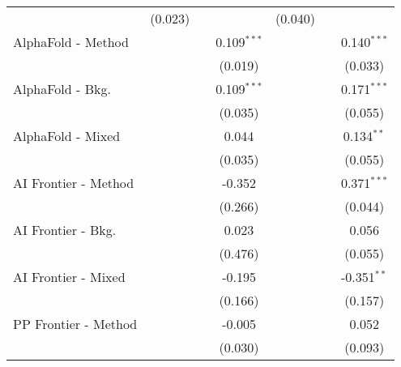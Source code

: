 \begin{tabular}{lcccccc}
                                  & (0.023)        &                &                & (0.040)        &                &   \\   
   AlphaFold - Method             &                &                & 0.109$^{***}$  &                &                & 0.140$^{***}$\\   
                                  &                &                & (0.019)        &                &                & (0.033)\\   
   AlphaFold - Bkg.               &                &                & 0.109$^{***}$  &                &                & 0.171$^{***}$\\   
                                  &                &                & (0.035)        &                &                & (0.055)\\   
   AlphaFold - Mixed              &                &                & 0.044          &                &                & 0.134$^{**}$\\   
                                  &                &                & (0.035)        &                &                & (0.055)\\   
   AI Frontier - Method           &                &                & -0.352         &                &                & 0.371$^{***}$\\   
                                  &                &                & (0.266)        &                &                & (0.044)\\   
   AI Frontier - Bkg.             &                &                & 0.023          &                &                & 0.056\\   
                                  &                &                & (0.476)        &                &                & (0.055)\\   
   AI Frontier - Mixed            &                &                & -0.195         &                &                & -0.351$^{**}$\\   
                                  &                &                & (0.166)        &                &                & (0.157)\\   
   PP Frontier - Method           &                &                & -0.005         &                &                & 0.052\\   
                                  &                &                & (0.030)        &                &                & (0.093)\\   

\end{tabular}
